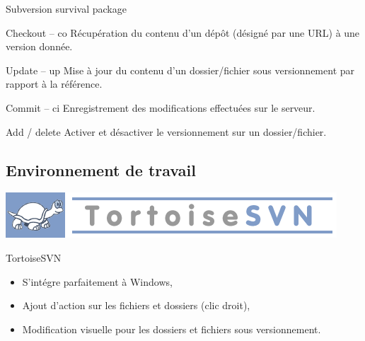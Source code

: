 \begin{frame}{Subversion survival package}
  \begin{block}{Checkout -- co}
    Récupération du contenu d'un dépôt (désigné par une URL) à une version donnée.
  \end{block}
  \begin{block}{Update -- up}
    Mise à jour du contenu d'un dossier/fichier sous versionnement par rapport à la référence.
  \end{block}
  \begin{block}{Commit -- ci}
    Enregistrement des modifications effectuées sur le serveur.
  \end{block}
  \begin{block}{Add / delete}
    Activer et désactiver le versionnement sur un dossier/fichier.
  \end{block}
\end{frame}



\subsection{Environnement de travail}
\begin{frame}
  \begin{center}
    \includegraphics[scale=0.35]{images/logo_tortoise}
  \end{center}
  \begin{alertblock}{TortoiseSVN}
    \begin{itemize}
    \item S'intégre parfaitement à Windows,
    \item Ajout d'action sur les fichiers et dossiers (clic droit),
      \item Modification visuelle pour les dossiers et fichiers sous versionnement.
      \end{itemize}
    \end{alertblock}
\end{frame}

